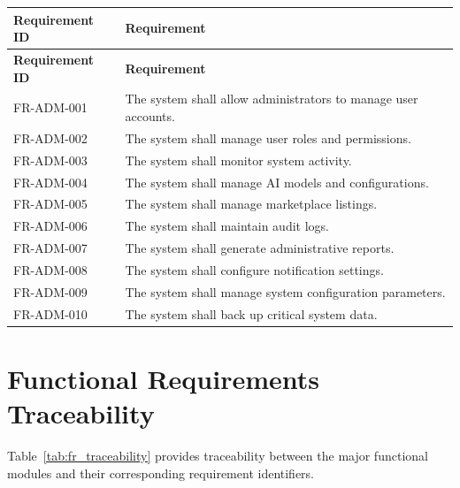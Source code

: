 \begin{longtable}{|p{3cm}|p{10.2cm}|}

\hline
\textbf{Requirement ID} &
\textbf{Requirement} \\
\hline
\endfirsthead

\hline
\textbf{Requirement ID} &
\textbf{Requirement} \\
\hline
\endhead

FR-ADM-001 &
The system shall allow administrators to manage user accounts.\\
\hline

FR-ADM-002 &
The system shall manage user roles and permissions.\\
\hline

FR-ADM-003 &
The system shall monitor system activity.\\
\hline

FR-ADM-004 &
The system shall manage AI models and configurations.\\
\hline

FR-ADM-005 &
The system shall manage marketplace listings.\\
\hline

FR-ADM-006 &
The system shall maintain audit logs.\\
\hline

FR-ADM-007 &
The system shall generate administrative reports.\\
\hline

FR-ADM-008 &
The system shall configure notification settings.\\
\hline

FR-ADM-009 &
The system shall manage system configuration parameters.\\
\hline

FR-ADM-010 &
The system shall back up critical system data.\\
\hline

\end{longtable}

\section{Functional Requirements Traceability}
\label{sec:functional-traceability}

Table~\ref{tab:fr_traceability} provides traceability between the major
functional modules and their corresponding requirement identifiers.

